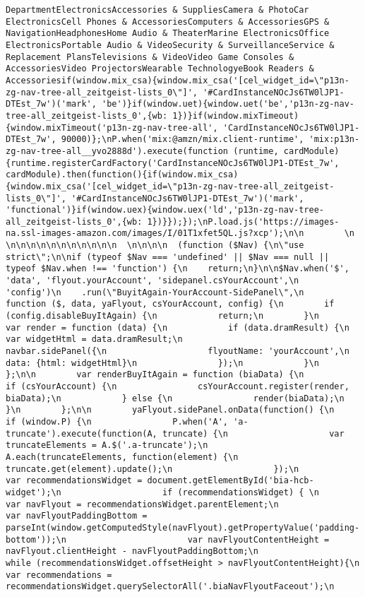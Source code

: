\documentclass[
]{article}
\begin{document}
\begin{verbatim}
DepartmentElectronicsAccessories & SuppliesCamera & PhotoCar ElectronicsCell Phones & AccessoriesComputers & AccessoriesGPS & NavigationHeadphonesHome Audio & TheaterMarine ElectronicsOffice ElectronicsPortable Audio & VideoSecurity & SurveillanceService & Replacement PlansTelevisions & VideoVideo Game Consoles & AccessoriesVideo ProjectorsWearable TechnologyeBook Readers & Accessoriesif(window.mix_csa){window.mix_csa('[cel_widget_id=\"p13n-zg-nav-tree-all_zeitgeist-lists_0\"]', '#CardInstanceNOcJs6TW0lJP1-DTEst_7w')('mark', 'be')}if(window.uet){window.uet('be','p13n-zg-nav-tree-all_zeitgeist-lists_0',{wb: 1})}if(window.mixTimeout){window.mixTimeout('p13n-zg-nav-tree-all', 'CardInstanceNOcJs6TW0lJP1-DTEst_7w', 90000)};\nP.when('mix:@amzn/mix.client-runtime', 'mix:p13n-zg-nav-tree-all__yvo2888d').execute(function (runtime, cardModule) {runtime.registerCardFactory('CardInstanceNOcJs6TW0lJP1-DTEst_7w', cardModule).then(function(){if(window.mix_csa){window.mix_csa('[cel_widget_id=\"p13n-zg-nav-tree-all_zeitgeist-lists_0\"]', '#CardInstanceNOcJs6TW0lJP1-DTEst_7w')('mark', 'functional')}if(window.uex){window.uex('ld','p13n-zg-nav-tree-all_zeitgeist-lists_0',{wb: 1})}});});\nP.load.js('https://images-na.ssl-images-amazon.com/images/I/01T1xfet5QL.js?xcp');\n\n        \n    \n\n\n\n\n\n\n\n\n\n\n  \n\n\n\n  (function ($Nav) {\n\"use strict\";\n\nif (typeof $Nav === 'undefined' || $Nav === null || typeof $Nav.when !== 'function') {\n    return;\n}\n\n$Nav.when('$', 'data', 'flyout.yourAccount', 'sidepanel.csYourAccount',\n          'config')\n    .run(\"BuyitAgain-YourAccount-SidePanel\",\n    function ($, data, yaFlyout, csYourAccount, config) {\n        if (config.disableBuyItAgain) {\n            return;\n        }\n        var render = function (data) {\n            if (data.dramResult) {\n                var widgetHtml = data.dramResult;\n                navbar.sidePanel({\n                    flyoutName: 'yourAccount',\n                    data: {html: widgetHtml}\n                });\n            }\n        };\n\n        var renderBuyItAgain = function (biaData) {\n            if (csYourAccount) {\n                csYourAccount.register(render, biaData);\n            } else {\n                render(biaData);\n            }\n        };\n\n        yaFlyout.sidePanel.onData(function() {\n            if (window.P) {\n                P.when('A', 'a-truncate').execute(function(A, truncate) {\n                    var truncateElements = A.$('.a-truncate');\n                    A.each(truncateElements, function(element) {\n                        truncate.get(element).update();\n                    });\n                    var recommendationsWidget = document.getElementById('bia-hcb-widget');\n                    if (recommendationsWidget) { \n                        var navFlyout = recommendationsWidget.parentElement;\n                        var navFlyoutPaddingBottom = parseInt(window.getComputedStyle(navFlyout).getPropertyValue('padding-bottom'));\n                        var navFlyoutContentHeight = navFlyout.clientHeight - navFlyoutPaddingBottom;\n                        while (recommendationsWidget.offsetHeight > navFlyoutContentHeight){\n                            var recommendations = recommendationsWidget.querySelectorAll('.biaNavFlyoutFaceout');\n           
\end{verbatim}
\end{document}
